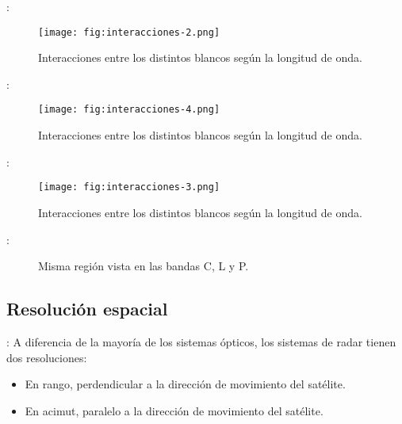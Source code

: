 \begin{frame}{\secname : \subsecname}
    \begin{figure}
      \centering
      \texttt{[image: fig:interacciones-2.png]}
      \caption{Interacciones entre los distintos blancos según la longitud de onda.}
      \label{}
    \end{figure}
\end{frame}

\begin{frame}{\secname : \subsecname}
    \begin{figure}
      \centering
      \texttt{[image: fig:interacciones-4.png]}
      \caption{Interacciones entre los distintos blancos según la longitud de onda.}
      \label{}
    \end{figure}
\end{frame}

\begin{frame}{\secname : \subsecname}
    \begin{figure}
      \centering
      \texttt{[image: fig:interacciones-3.png]}
      \caption{Interacciones entre los distintos blancos según la longitud de onda.}
      \label{}
    \end{figure}
\end{frame}




\begin{frame}{\secname : \subsecname}
    \begin{figure}
    \centering
    \hspace{1cm}
    \hspace{1cm}
    \caption{Misma región vista en las bandas C, L y P.}
    \end{figure}
\end{frame}
\subsection{Resolución espacial}

\begin{frame}{\secname : \subsecname}
    A diferencia de la mayoría de los sistemas ópticos, los sistemas de radar tienen dos resoluciones:
    \begin{itemize}
      \item En rango, perdendicular a la dirección de movimiento del satélite.
      \item En acimut, paralelo a la dirección de movimiento del satélite.
    \end{itemize}
\end{frame}

